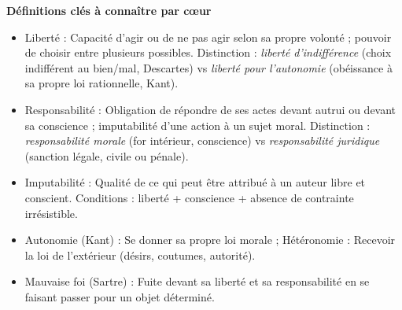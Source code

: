 \documentclass[11pt]{article}
\newcommand{\cle}[1]{{\popxbold\color{popdark}#1}}
\newcounter{popsec}
\newcounter{popsub}
\newcommand{\courssub}[1]{%
  \stepcounter{popsub}%
  \par\vspace{9pt}\noindent{\popxbold\fontsize{11.5}{13}\selectfont\color{popink}{\color{poporange}\thepopsec.\thepopsub}\hspace{6pt}#1}\par\nopagebreak\vspace{4pt}
}
\begin{document}
\courssub{Bilan révisable}
\begin{aretenir}

\textbf{Définitions clés à connaître par cœur}
\begin{itemize}
  \item \cle{Liberté} : Capacité d'agir ou de ne pas agir selon sa propre volonté ; pouvoir de choisir entre plusieurs possibles. Distinction : \emph{liberté d'indifférence} (choix indifférent au bien/mal, Descartes) vs \emph{liberté pour l'autonomie} (obéissance à sa propre loi rationnelle, Kant).
  \item \cle{Responsabilité} : Obligation de répondre de ses actes devant autrui ou devant sa conscience ; imputabilité d'une action à un sujet moral. Distinction : \emph{responsabilité morale} (for intérieur, conscience) vs \emph{responsabilité juridique} (sanction légale, civile ou pénale).
  \item \cle{Imputabilité} : Qualité de ce qui peut être attribué à un auteur libre et conscient. Conditions : liberté + conscience + absence de contrainte irrésistible.
  \item \cle{Autonomie} (Kant) : Se donner sa propre loi morale ; \cle{Hétéronomie} : Recevoir la loi de l'extérieur (désirs, coutumes, autorité).
  \item \cle{Mauvaise foi} (Sartre) : Fuite devant sa liberté et sa responsabilité en se faisant passer pour un objet déterminé.
\end{itemize}


\end{aretenir}
\end{document}
